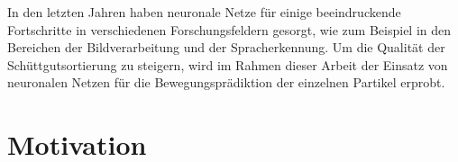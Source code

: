 In den letzten Jahren haben neuronale Netze für einige beeindruckende Fortschritte in verschiedenen Forschungsfeldern gesorgt,
wie zum Beispiel in den Bereichen der Bildverarbeitung und der Spracherkennung.
Um die Qualität der Schüttgutsortierung zu steigern,
wird im Rahmen dieser Arbeit der Einsatz von neuronalen Netzen für die Bewegungsprädiktion der einzelnen Partikel erprobt.




\section{Motivation}


